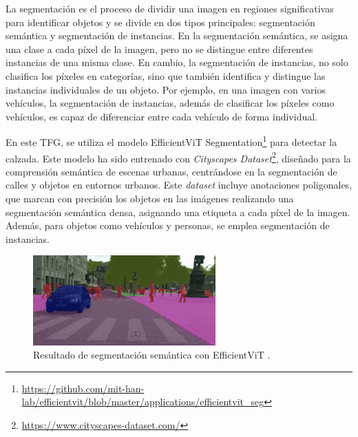La segmentación es el proceso de dividir una imagen en regiones significativas para identificar objetos y se divide en dos tipos principales: segmentación semántica y segmentación de instancias. En la segmentación semántica, se asigna una clase a cada píxel de la imagen, pero no se distingue entre diferentes instancias de una misma clase. En cambio, la segmentación de instancias, no solo clasifica los píxeles en categorías, sino que también identifica y distingue las instancias individuales de un objeto. Por ejemplo, en una imagen con varios vehículos, la segmentación de instancias, además de clasificar los píxeles como vehículos, es capaz de diferenciar entre cada vehículo de forma individual.

En este \ac{TFG}, se utiliza el modelo EfficientViT Segmentation\footnote{\url{https://github.com/mit-han-lab/efficientvit/blob/master/applications/efficientvit_seg}} para detectar la calzada. Este modelo ha sido entrenado con \textit{Cityscapes Dataset}\footnote{\url{https://www.cityscapes-dataset.com/}}, diseñado para la comprensión semántica de escenas urbanas, centrándose en la segmentación de calles y objetos en entornos urbanos. Este \textit{dataset} incluye anotaciones poligonales, que marcan con precisión los objetos en las imágenes realizando una segmentación semántica densa, asignando una etiqueta a cada píxel de la imagen. Además, para objetos como vehículos y personas, se emplea segmentación de instancias.

\begin{figure}[ht]
\begin{center}
\includegraphics[width=7cm]{figs/Plataformas_Desarollo/resultado_ef.png}
\end{center}
\caption{Resultado de segmentación semántica con EfficientViT \cite{efficientvit-gif}.}
\label{foto_ef}
\end{figure}

